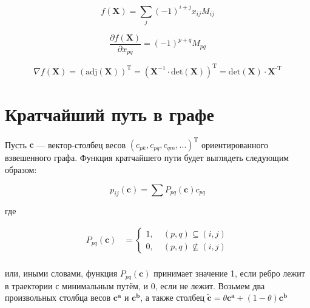 	
	\begin{equation}
	f(\mathbf{X}) = \sum_j (-1)^{i+j} x_{ij} M_{ij}
	\end{equation}
	
	\begin{equation}
	\frac{\partial f(\mathbf{X}) }{\partial x_{pq}} = (-1)^{p+q}  M_{pq}
	\end{equation}
	
	\begin{equation}
	\nabla f(\mathbf{X})  = (\text{adj}(\mathbf{X}))^{\text{T}} = (\mathbf{X}^{-1}\cdot \text{det}(\mathbf{X}))^{\text{T}} = \text{det}(\mathbf{X}) \cdot\mathbf{X}^{\text{-T}}
	\end{equation}
	
	\subsection{}
	
	\subsection{}
	
	\section{Кратчайший путь в графе}
	
	Пусть $\mathbf{c}$ --- вектор-столбец весов $(c_{pk}, c_{pq}, c_{qm}, ...)^{\text{T}}$ ориентированного взвешенного графа. Функция кратчайшего пути будет выглядеть следующим образом:
	
	\begin{equation}
	p_{ij}(\mathbf{c}) = \sum P_{pq}(\mathbf{c}) c_{pq}
	\end{equation}
	
	где 
	

	\begin{align}
	 P_{pq}(\mathbf{c}) &=
	\left\{
	\begin{aligned}
	1 ,\; & (p,q) \subseteq (i,j) \\
	0 ,\; & (p,q) \nsubseteq (i,j)
	\end{aligned}
	\right. \\
	\end{align}
	
	или, иными словами, функция $P_{pq}(\mathbf{c})$ принимает значение 1, если ребро лежит в траектории с минимальным путём, и 0, если не лежит. Возьмем два произвольных столбца весов $\mathbf{c^a}$ и $\mathbf{c^b}$, а также столбец $\mathbf{\tilde{c}} = \theta \mathbf{c^a} + (1-\theta)\mathbf{c^b}$
	
